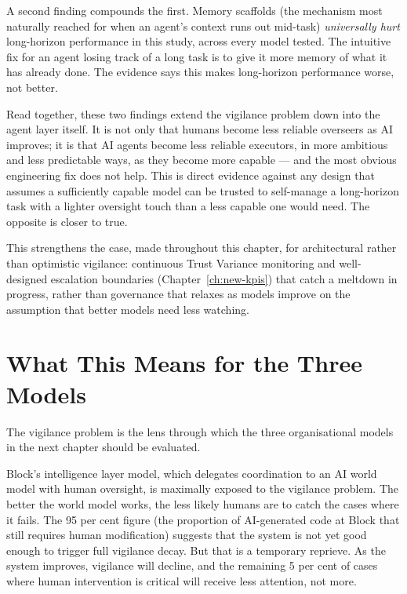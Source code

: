 A second finding compounds the first. Memory scaffolds (the mechanism most naturally reached for when an agent's context runs out mid-task) \emph{universally hurt} long-horizon performance in this study, across every model tested. The intuitive fix for an agent losing track of a long task is to give it more memory of what it has already done. The evidence says this makes long-horizon performance worse, not better.

\begin{cautionbox}[title={Trust-the-Model Optimism Is Not a Strategy}]
Read together, these two findings extend the vigilance problem down into the agent layer itself. It is not only that humans become less reliable overseers as AI improves; it is that AI agents become less reliable executors, in more ambitious and less predictable ways, as they become more capable --- and the most obvious engineering fix does not help. This is direct evidence against any design that assumes a sufficiently capable model can be trusted to self-manage a long-horizon task with a lighter oversight touch than a less capable one would need. The opposite is closer to true.

This strengthens the case, made throughout this chapter, for architectural rather than optimistic vigilance: continuous Trust Variance monitoring and well-designed escalation boundaries (Chapter~\ref{ch:new-kpis}) that catch a meltdown in progress, rather than governance that relaxes as models improve on the assumption that better models need less watching.
\end{cautionbox}

\section{What This Means for the Three Models}

The vigilance problem is the lens through which the three organisational models in the next chapter should be evaluated.

Block's intelligence layer model, which delegates coordination to an AI world model with human oversight, is maximally exposed to the vigilance problem. The better the world model works, the less likely humans are to catch the cases where it fails. The 95 per cent figure (the proportion of AI-generated code at Block that still requires human modification) suggests that the system is not yet good enough to trigger full vigilance decay. But that is a temporary reprieve. As the system improves, vigilance will decline, and the remaining 5 per cent of cases where human intervention is critical will receive less attention, not more.

